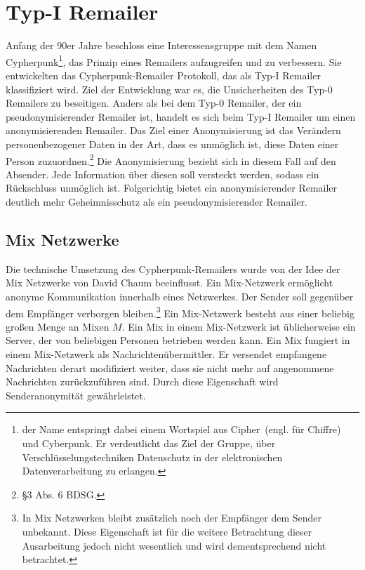 \chapter{Typ-I Remailer}
Anfang der 90er Jahre beschloss eine Interessensgruppe mit dem Namen \glqq Cypherpunk\grqq\footnote{der Name entspringt dabei einem Wortspiel aus \glqq Cipher\grqq ~(engl. für Chiffre) und \glqq Cyberpunk\grqq. Er verdeutlicht das Ziel der Gruppe, über Verschlüsselungstechniken Datenschutz in der elektronischen Datenverarbeitung zu erlangen.}, das Prinzip eines Remailers aufzugreifen und zu verbessern. Sie entwickelten das Cypherpunk-Remailer Protokoll, das als Typ-I Remailer klassifiziert wird. Ziel der Entwicklung war es, die Unsicherheiten des Typ-0 Remailers zu beseitigen.
Anders als bei dem Typ-0 Remailer, der ein pseudonymisierender Remailer ist, handelt es sich beim Typ-I Remailer um einen anonymisierenden Remailer. Das Ziel einer Anonymisierung ist das Verändern personenbezogener Daten in der Art, dass es unmöglich ist, diese Daten einer Person zuzuordnen.\footnote {§3 Abs. 6 BDSG.}
Die Anonymisierung bezieht sich in diesem Fall auf den Absender. Jede Information über diesen soll versteckt werden, sodass ein Rückschluss unmöglich ist\cite[S. 151]{horster2013datenschutz}. Folgerichtig bietet ein anonymisierender Remailer deutlich mehr Geheimnisschutz als ein pseudonymisierender Remailer. 


\section{Mix Netzwerke}
Die technische Umsetzung des Cypherpunk-Remailers wurde von der Idee der Mix Netzwerke von David Chaum beeinflusst. Ein Mix-Netzwerk ermöglicht anonyme Kommunikation innerhalb eines Netzwerkes. Der Sender soll gegenüber dem Empfänger verborgen bleiben.\footnote{In Mix Netzwerken bleibt zusätzlich noch der Empfänger dem Sender unbekannt. Diese Eigenschaft ist für die weitere Betrachtung dieser Ausarbeitung jedoch nicht wesentlich und wird dementsprechend nicht betrachtet.}
Ein Mix-Netzwerk besteht aus einer beliebig großen Menge an Mixen \(M\). Ein Mix in einem Mix-Netzwerk ist üblicherweise ein Server, der von beliebigen Personen betrieben werden kann. Ein Mix fungiert in einem Mix-Netzwerk als Nachrichtenübermittler. Er versendet empfangene Nachrichten derart modifiziert weiter, dass sie nicht mehr auf angenommene Nachrichten zurückzuführen sind. Durch diese Eigenschaft wird Senderanonymität gewährleistet\cite{chaum1981}.

